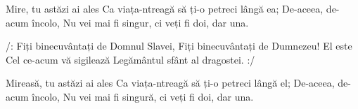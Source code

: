 \beginverse
Mire, tu astăzi ai ales
Ca viața-ntreagă să ți-o petreci lângă ea;
De-aceea, de-acum încolo,
Nu vei mai fi singur, ci veți fi doi, dar una.
\endverse

\beginchorus
/: Fiți binecuvântați de Domnul Slavei,
Fiți binecuvântați de Dumnezeu!
El este Cel ce-acum vă sigilează
Legământul sfânt al dragostei. :/
\endchorus

\beginverse
Mireasă, tu astăzi ai ales
Ca viața-ntreagă să ți-o petreci lângă el;
De-aceea, de-acum încolo,
Nu vei mai fi singură, ci veți fi doi, dar una.
\endverse
\endsong